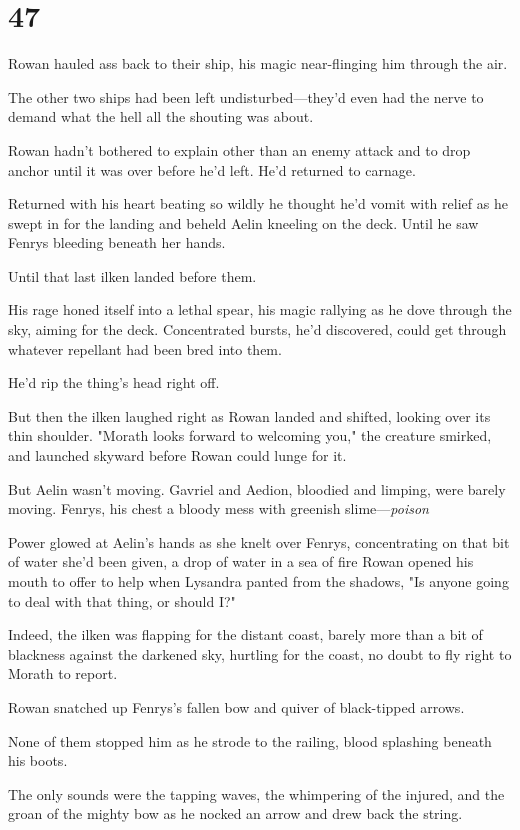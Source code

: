 
\chapter{47}

Rowan hauled ass back to their ship, his magic near-flinging him through the air.

The other two ships had been left undisturbed---they'd even had the nerve to demand what the hell all the shouting was about.

Rowan hadn't bothered to explain other than an enemy attack and to drop anchor until it was over before he'd left.
He'd returned to carnage.

Returned with his heart beating so wildly he thought he'd vomit with relief as he swept in for the landing and beheld Aelin kneeling on the deck.
Until he saw Fenrys bleeding beneath her hands.

Until that last ilken landed before them.

His rage honed itself into a lethal spear, his magic rallying as he dove through the sky, aiming for the deck.
Concentrated bursts, he'd discovered, could get through whatever repellant had been bred into them.

He'd rip the thing's head right off.

But then the ilken laughed right as Rowan landed and shifted, looking over its thin shoulder.
"Morath looks forward to welcoming you," the creature smirked, and launched skyward before Rowan could lunge for it.

But Aelin wasn't moving.
Gavriel and Aedion, bloodied and limping, were barely moving.
Fenrys, his chest a bloody mess with greenish slime---\emph{poison} 

Power glowed at Aelin's hands as she knelt over Fenrys, concentrating on that bit of water she'd been given, a drop of water in a sea of fire 
Rowan opened his mouth to offer to help when Lysandra panted from the shadows, "Is anyone going to deal with that thing, or should I?"

Indeed, the ilken was flapping for the distant coast, barely more than a bit of blackness against the darkened sky, hurtling for the coast, no doubt to fly right to Morath to report.

Rowan snatched up Fenrys's fallen bow and quiver of black-tipped arrows.

None of them stopped him as he strode to the railing, blood splashing beneath his boots.

The only sounds were the tapping waves, the whimpering of the injured, and the groan of the mighty bow as he nocked an arrow and drew back the string.

